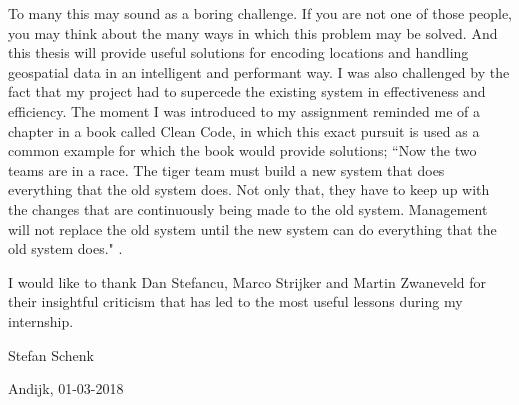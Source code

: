 To many this may sound as a boring challenge. If you are not one of those people, you may think about the many ways in which this problem may be solved. And this thesis will provide useful solutions for encoding locations and handling geospatial data in an intelligent and performant way. I was also challenged by the fact that my project had to supercede the existing system in effectiveness and efficiency. The moment I was introduced to my assignment reminded me of a chapter in a book called Clean Code, in which this exact pursuit is used as a common example for which the book would provide solutions; “Now the two teams are in a race. The tiger team must build a new system that does everything that the old system does. Not only that, they have to keep up with the changes that are continuously being made to the old system. Management will not replace the old system until the new system can do everything that the old system does." \cite{b0}.

I would like to thank Dan Stefancu, Marco Strijker and Martin Zwaneveld for their insightful criticism that has led to the most useful lessons during my internship.

Stefan Schenk

Andijk, 01-03-2018